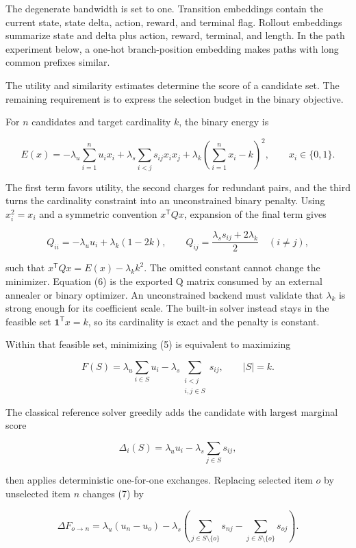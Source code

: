 \documentclass{strategynet-journal}
\begin{document}
The degenerate bandwidth is set to one.  Transition embeddings contain the
current state, state delta, action, reward, and terminal flag.  Rollout
embeddings summarize state and delta plus action, reward, terminal, and length.
In the path experiment below, a one-hot branch-position embedding makes paths
with long common prefixes similar.

The utility and similarity estimates determine the score of a candidate set.
The remaining requirement is to express the selection budget in the binary
objective.

For $n$ candidates and target cardinality $k$, the binary energy is

\[
 E(x)=
 -\lambda_u\sum_{i=1}^{n}u_i x_i
 +\lambda_s\sum_{i<j}s_{ij}x_ix_j
 +\lambda_k\left(\sum_{i=1}^{n}x_i-k\right)^2,
 \qquad x_i\in\{0,1\}.
 \tag{5}
\]

The first term favors utility, the second charges for redundant pairs, and the
third turns the cardinality constraint into an unconstrained binary penalty.
Using $x_i^2=x_i$ and a symmetric convention $x^{\mathsf T}Qx$, expansion of
the final term gives

\[
 Q_{ii}=-\lambda_u u_i+\lambda_k(1-2k),
 \qquad
 Q_{ij}=\frac{\lambda_s s_{ij}+2\lambda_k}{2}\quad(i\ne j),
 \tag{6}
\]

such that $x^{\mathsf T}Qx=E(x)-\lambda_k k^2$.  The omitted constant cannot
change the minimizer.  Equation (6) is the exported Q matrix consumed by an
external annealer or binary optimizer.  An unconstrained backend must validate
that $\lambda_k$ is strong enough for its coefficient scale.  The built-in
solver instead stays in the feasible set $\mathbf{1}^{\mathsf T}x=k$, so its
cardinality is exact and the penalty is constant.

Within that feasible set, minimizing (5) is equivalent to maximizing

\[
 F(S)=\lambda_u\sum_{i\in S}u_i
      -\lambda_s\sum_{\substack{i<j\\i,j\in S}}s_{ij},
 \qquad |S|=k .
 \tag{7}
\]

The classical reference solver greedily adds the candidate with largest
marginal score

\[
 \Delta_i(S)=\lambda_u u_i-\lambda_s\sum_{j\in S}s_{ij},
 \tag{8}
\]

then applies deterministic one-for-one exchanges.  Replacing selected item
$o$ by unselected item $n$ changes (7) by

\[
 \Delta F_{o\rightarrow n}
 =\lambda_u(u_n-u_o)
 -\lambda_s\!\left(
   \sum_{j\in S\setminus\{o\}}s_{nj}
   -\sum_{j\in S\setminus\{o\}}s_{oj}
 \right).
 \tag{9}
\]
\end{document}
